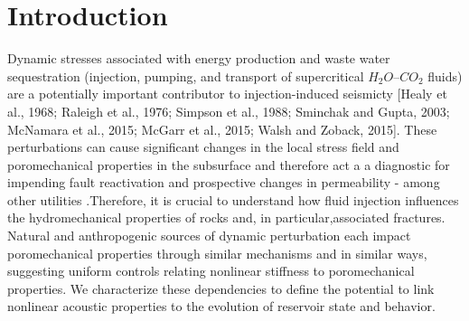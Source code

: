\documentclass[draft]{agujournal2019}
\begin{document}

%
%
%
%


\section{Introduction}
Dynamic stresses associated with energy production and waste water sequestration (injection, pumping, and transport of supercritical $H_{2}O$--$CO_{2}$ fluids) are a potentially important contributor to injection-induced seismicty [Healy et al., 1968; Raleigh et al., 1976; Simpson et al., 1988; Sminchak and Gupta, 2003; McNamara et al., 2015; McGarr et al., 2015; Walsh and Zoback, 2015]. These perturbations can cause significant changes in the local stress field and poromechanical properties in the subsurface and therefore act a a diagnostic for impending fault reactivation and prospective changes in permeability - among other utilities .Therefore, it is crucial to understand how fluid injection influences the hydromechanical properties of rocks and, in particular,associated fractures. Natural and anthropogenic sources of dynamic perturbation each impact poromechanical properties through similar mechanisms and in similar ways, suggesting uniform controls relating nonlinear stiffness to poromechanical properties. We characterize these dependencies to define the potential to link nonlinear acoustic properties to the evolution of reservoir state and behavior.
\end{document}
